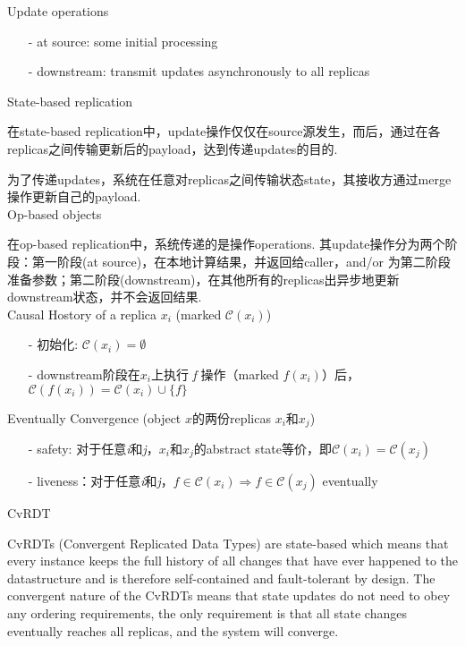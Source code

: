 \documentclass[UTF8,a4paper]{ctexart}
\begin{document}
	
	\noindent Update operations
	\begin{itemize}
		\small\item[-] 	at source: some initial processing
		\small\item[-]  downstream: transmit updates asynchronously to all replicas
	\end{itemize}
	
	\noindent State-based replication 
	
	在state-based replication中，update操作仅仅在source源发生，而后，通过在各replicas之间传输更新后的payload，达到传递updates的目的.
	
	为了传递updates，系统在任意对replicas之间传输状态state，其接收方通过merge操作更新自己的payload.\\
	
	\noindent Op-based objects
	
	在op-based replication中，系统传递的是操作operations. 其update操作分为两个阶段：第一阶段(at source)，在本地计算结果，并返回给caller，and/or 为第二阶段准备参数；第二阶段(downstream)，在其他所有的replicas出异步地更新downstream状态，并不会返回结果.\\
	
	\noindent Causal Hostory of a replica $x_i$ (marked $ \mathcal{C} \left( x_i \right)  $)
	\begin{itemize}
		\small\item[-] 	初始化: $ \mathcal{C} \left( x_i \right) = \emptyset $ 
		\small\item[-]  downstream阶段在$x_i$上执行 \emph{f} 操作（marked $ f\left(x_i\right) $）后，$ \mathcal{C} \left( f\left( x_i \right) \right) = \mathcal{C} \left( x_i \right) \cup \{f\} $
	\end{itemize}

	\noindent Eventually Convergence (object $x$的两份replicas $ x_i $和$ x_j $)
	\begin{itemize}
		\small\item[-] 	safety: 对于任意\emph{i}和\emph{j}，$x_i$和$x_j$的abstract state等价，即$\mathcal{C} \left( x_i \right)=\mathcal{C} \left( x_j \right)$
		\small\item[-]  liveness：对于任意\emph{i}和\emph{j}，$f \in \mathcal{C} \left( x_i \right) \Longrightarrow f \in \mathcal{C} \left( x_j \right)$ eventually
	\end{itemize}

	\noindent CvRDT
	
	CvRDTs (Convergent Replicated Data Types) are state-based which means that every instance keeps the full history of all changes that have ever happened to the datastructure and is therefore self-contained and fault-tolerant by design. The convergent nature of the CvRDTs means that state updates do not need to obey any ordering requirements, the only requirement is that all state changes eventually reaches all replicas, and the system will converge.
	
\end{document}
